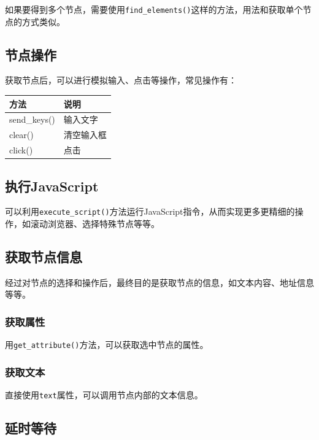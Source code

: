 \documentclass[]{ctexbook}
\begin{document}
如果要得到多个节点，需要使用\texttt{find\_elements()}这样的方法，用法和获取单个节点的方式类似。

\hypertarget{ux8282ux70b9ux64cdux4f5c}{%
\subsection{节点操作}\label{ux8282ux70b9ux64cdux4f5c}}

获取节点后，可以进行模拟输入、点击等操作，常见操作有：

\begin{longtable}[]{@{}ll@{}}
\toprule
方法 & 说明\tabularnewline
\midrule
\endhead
send\_keys() & 输入文字\tabularnewline
clear() & 清空输入框\tabularnewline
click() & 点击\tabularnewline
\bottomrule
\end{longtable}

\hypertarget{ux6267ux884cjavascript}{%
\subsection{执行JavaScript}\label{ux6267ux884cjavascript}}

可以利用\texttt{execute\_script()}方法运行JavaScript指令，从而实现更多更精细的操作，如滚动浏览器、选择特殊节点等等。

\hypertarget{ux83b7ux53d6ux8282ux70b9ux4fe1ux606f}{%
\subsection{获取节点信息}\label{ux83b7ux53d6ux8282ux70b9ux4fe1ux606f}}

经过对节点的选择和操作后，最终目的是获取节点的信息，如文本内容、地址信息等等。

\hypertarget{ux83b7ux53d6ux5c5eux6027}{%
\subsubsection{获取属性}\label{ux83b7ux53d6ux5c5eux6027}}

用\texttt{get\_attribute()}方法，可以获取选中节点的属性。

\hypertarget{ux83b7ux53d6ux6587ux672c}{%
\subsubsection{获取文本}\label{ux83b7ux53d6ux6587ux672c}}

直接使用\texttt{text}属性，可以调用节点内部的文本信息。

\hypertarget{ux5ef6ux65f6ux7b49ux5f85}{%
\subsection{延时等待}\label{ux5ef6ux65f6ux7b49ux5f85}}
\end{document}

